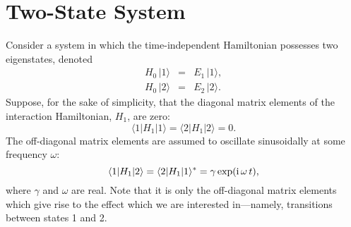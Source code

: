 \section{Two-State System}
Consider a system in which the time-independent Hamiltonian 
possesses two eigenstates, denoted
\begin{eqnarray}
H_0 \,|1\rangle &=& E_1\, |1\rangle, \\[0.5ex]
H_0 \,|2\rangle &=& E_2 \,|2\rangle.
\end{eqnarray}
Suppose, for the sake of simplicity, that the diagonal matrix
elements of the interaction Hamiltonian, $H_1$, are zero:
\begin{equation}
\langle 1|H_1|1\rangle = \langle 2|H_1|2\rangle = 0.
\end{equation}
The off-diagonal matrix elements are assumed to oscillate sinusoidally
at some frequency $\omega$:
\begin{equation}
\langle 1|H_1|2\rangle = \langle 2|H_1|1\rangle^\ast = \gamma \exp({\rm i}\,
\omega\,t),
\end{equation}
where $\gamma$ and $\omega$ are real. 
Note that it is only the off-diagonal matrix elements which give rise to
the effect which we are interested in---namely, transitions between states
1 and 2.

